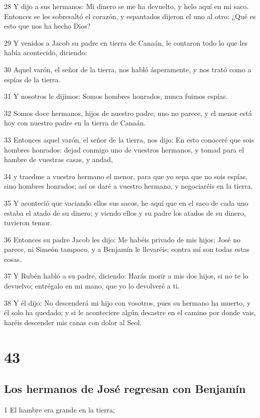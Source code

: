 28 Y dijo a sus hermanos: Mi dinero se me ha devuelto, y helo aquí en mi saco. Entonces se les sobresaltó el corazón, y espantados dijeron el uno al otro: ¿Qué es esto que nos ha hecho Dios?

29 Y venidos a Jacob su padre en tierra de Canaán, le contaron todo lo que les había acontecido, diciendo:

30 Aquel varón, el señor de la tierra, nos habló ásperamente, y nos trató como a espías de la tierra.

31 Y nosotros le dijimos: Somos hombres honrados, nunca fuimos espías.

32 Somos doce hermanos, hijos de nuestro padre; uno no parece, y el menor está hoy con nuestro padre en la tierra de Canaán.

33 Entonces aquel varón, el señor de la tierra, nos dijo: En esto conoceré que sois hombres honrados: dejad conmigo uno de vuestros hermanos, y tomad para el hambre de vuestras casas, y andad,

34 y traedme a vuestro hermano el menor, para que yo sepa que no sois espías, sino hombres honrados; así os daré a vuestro hermano, y negociaréis en la tierra.

35 Y aconteció que vaciando ellos sus sacos, he aquí que en el saco de cada uno estaba el atado de su dinero; y viendo ellos y su padre los atados de su dinero, tuvieron temor.

36 Entonces su padre Jacob les dijo: Me habéis privado de mis hijos; José no parece, ni Simeón tampoco, y a Benjamín le llevaréis; contra mí son todas estas cosas.

37 Y Rubén habló a su padre, diciendo: Harás morir a mis dos hijos, si no te lo devuelvo; entrégalo en mi mano, que yo lo devolveré a ti.

38 Y él dijo: No descenderá mi hijo con vosotros, pues su hermano ha muerto, y él solo ha quedado; y si le aconteciere algún desastre en el camino por donde vais, haréis descender mis canas con dolor al Seol.

\chapter{43}

\section{Los hermanos de José regresan con Benjamín}

1 El hambre era grande en la tierra;

